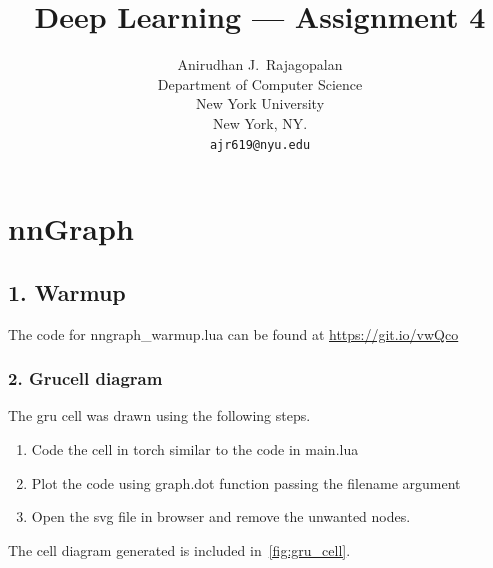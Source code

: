 \documentclass{article}
\title{Deep Learning --- Assignment 4}
\author{Anirudhan J.~Rajagopalan \\
  Department of Computer Science\\
  New York University\\
  New York, NY.\\
  \texttt{ajr619@nyu.edu} \\
}
\begin{document}
\maketitle

\section{nnGraph}
\subsection{1. Warmup}
The code for nngraph\_warmup.lua can be found at \url{https://git.io/vwQco}

\subsubsection{2. Grucell diagram}
The gru cell was drawn using the following steps.
\begin{enumerate}
  \item Code the cell in torch similar to the code in main.lua
  \item Plot the code using graph.dot function passing the filename argument
  \item Open the svg file in browser and remove the unwanted nodes.
\end{enumerate}

The cell diagram generated is included in~\ref{fig:gru_cell}.
\end{document}
